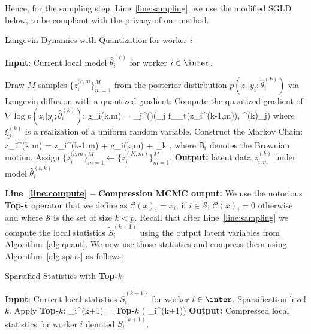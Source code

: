 \documentclass{article}
\begin{document}
Hence, for the sampling step, Line~\ref{line:sampling}, we use the modified SGLD below, to be compliant with the privacy of our method.
\begin{algorithm}[H]
\caption{Langevin Dynamics with Quantization for worker $i$} \label{alg:quant}
\begin{algorithmic}[1]
\STATE \textbf{Input}: Current local model $\hat{\theta}^{(r)}_i$ for worker $i \in \inter$.

\STATE Draw $M$ samples $\{ z_{i}^{(r,m} \}_{m=1}^M$ from the posterior distirbution $p(z_i| y_i; \hat{\theta}^{(k)}_i)$ via Langevin diffusion with a quantized gradient:\label{line:langevin}
\STATE Compute the quantized gradient of $\nabla \log p(z_i| y_i; \hat{\theta}^{(k)}_i)$:
\beq\label{eq:grad}
g_i{(k,m)} = _{j}^{(\ell)}\left(\nabla_j f_{\theta_t}(z_i^{(k-1,m)}), \xi^{(k)}_{j}\right)
\eeq
where $\xi^{(k)}_{j}$ is a realization of a uniform random variable.
\STATE Construct the Markov Chain:
\beq\label{eq:lang}
z_i^{(k,m)} = z_i^{(k-1,m)} +   g_i{(k,m)} +   _k \eqsp,
\eeq
where $\mathsf{B}_t$ denotes the Brownian motion.
\ENDFOR
\STATE Assign $\{ z_{i}^{(r,m} \}_{m=1}^M \leftarrow \{ z_i^{(K,m)} \}_{m=1}^M$.
\STATE \textbf{Output:} latent data $z_{i,m}^{(k)}$ under model $\hat{\theta}^{(t,k)}_i$ 
\end{algorithmic}
\end{algorithm}





\noindent \textbf{Line~\ref{line:compute} -- Compression MCMC output:}
We use the notorious \textbf{Top-$k$} operator that we define as $\mathcal C(x)_i=x_i$, if $i\in \mathcal S$; $\mathcal C(x)_i=0$ otherwise and where $\mathcal S$ is the set of size $k<p$.
Recall that after Line~\ref{line:sampling} we compute the local statistics $\tilde{S}_{i}^{(k+1)}$ using the output latent variables from Algorithm~\ref{alg:quant}.
We now use those statistics and compress them using Algorithm~\ref{alg:spars} as follows:

\begin{algorithm}[H]
\caption{Sparsified Statistics with \textbf{Top-$k$}} \label{alg:spars}
\begin{algorithmic}[1]
\STATE \textbf{Input}: Current local statistics $\tilde{S}_{i}^{(k+1)}$ for worker $i \in \inter$. Sparsification level $k$.
\STATE Apply \textbf{Top-$k$}:
\beq\label{eq:topkstats}
_{i}^{(k+1)} = \textbf{Top-$k$} \left( _{i}^{(k+1)}\right)
\eeq
\STATE \textbf{Output:} Compressed local statistics for worker $i$ denoted $\ddot{S}_{i}^{(k+1)}$.
\end{algorithmic}
\end{algorithm}
\end{document}
